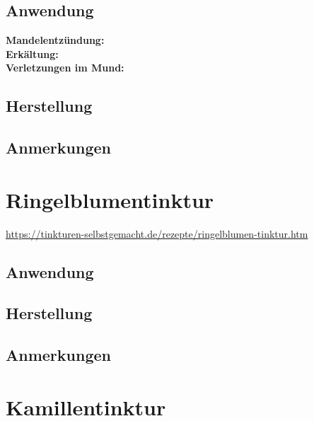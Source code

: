 
  

\subsection{Anwendung}
\textbf{Mandelentzündung:} \\

\textbf{Erkältung:} \\ 

\textbf{Verletzungen im Mund:} \\

\subsection{Herstellung}
\subsection{Anmerkungen}



\newpage



\section{Ringelblumentinktur}


\cite{tinkturen}

\url{https://tinkturen-selbstgemacht.de/rezepte/ringelblumen-tinktur.htm}


\subsection{Anwendung} 
\subsection{Herstellung}
\subsection{Anmerkungen}



\newpage



\section{Kamillentinktur}

